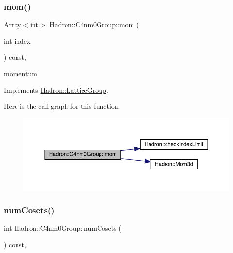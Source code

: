 \subsubsection{\texorpdfstring{mom()}{mom()}\hspace{0.1cm}{\footnotesize\ttfamily [2/2]}}
{\footnotesize\ttfamily \mbox{\hyperlink{classXMLArray_1_1Array}{Array}}$<$int$>$ Hadron\+::\+C4nm0\+Group\+::mom (\begin{DoxyParamCaption}\item[{int}]{index }\end{DoxyParamCaption}) const\hspace{0.3cm}{\ttfamily [inline]}, {\ttfamily [virtual]}}

momentum 

Implements \mbox{\hyperlink{structHadron_1_1LatticeGroup_ad577b65041dd9a6e84b1f3bd49cb8fce}{Hadron\+::\+Lattice\+Group}}.

Here is the call graph for this function\+:
\nopagebreak
\begin{figure}[H]
\begin{center}
\leavevmode
\includegraphics[width=350pt]{da/da1/structHadron_1_1C4nm0Group_a45599b94fa4633619247f4827e03ca23_cgraph}
\end{center}
\end{figure}
\mbox{\label{structHadron_1_1C4nm0Group_ad38f333075aa53f1b0c7bded9f7e70ad}} 
\subsubsection{\texorpdfstring{numCosets()}{numCosets()}\hspace{0.1cm}{\footnotesize\ttfamily [1/2]}}
{\footnotesize\ttfamily int Hadron\+::\+C4nm0\+Group\+::num\+Cosets (\begin{DoxyParamCaption}{ }\end{DoxyParamCaption}) const\hspace{0.3cm}{\ttfamily [inline]}, {\ttfamily [virtual]}}

